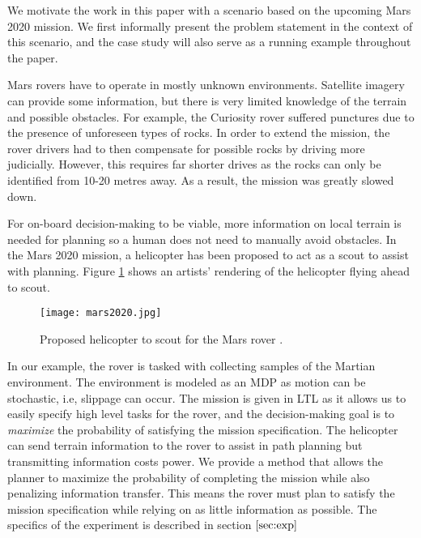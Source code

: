 We motivate the work in this paper with a scenario based on the upcoming Mars 2020 mission. We first informally present the problem statement in the context of this scenario, and the case study will also serve as a running example throughout the paper. 

Mars rovers have to operate in mostly unknown environments. Satellite imagery can provide some information, but there is very limited knowledge of the terrain and possible obstacles. For example, the Curiosity rover suffered punctures due to the presence of unforeseen types of rocks. In order to extend the mission, the rover drivers  had to then compensate for possible rocks by driving more judicially. However, this requires far shorter drives as the rocks can only be identified from 10-20 metres away. As a result, the mission was greatly slowed down. 

For on-board decision-making to be viable, more information on local terrain is needed for planning so a human does not need to manually avoid obstacles. In the Mars 2020 mission, a helicopter has been proposed to act as a scout \cite{landau2015helicopter} to assist with planning. Figure \ref{fig:mars2020} shows an artists' rendering of the helicopter flying ahead to scout.

\begin{figure}
\centering
\texttt{[image: mars2020.jpg]}
\caption{Proposed helicopter to scout for the Mars rover \cite{landau2015helicopter}.}\label{fig:mars2020}
\end{figure}

In our example, the rover is tasked with collecting samples of the Martian environment. The environment is modeled as an MDP as motion can be stochastic, i.e, slippage can occur. The mission is given in LTL as it allows us to easily specify high level tasks for the rover, and the decision-making goal is to \emph{maximize} the probability of satisfying the mission specification. The helicopter can send terrain information to the rover to assist in path planning but transmitting information costs power. We provide a method that allows the planner to maximize the probability of completing the mission while also penalizing information transfer. This means the rover must plan to satisfy the mission specification while relying on as little information as possible. The specifics of the experiment is described in section $\ref{sec:exp}$